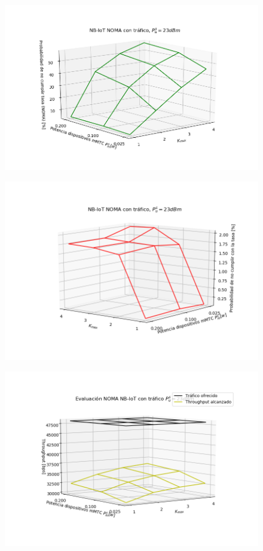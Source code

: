 \begin{figure}[th]
    \centering
    \includegraphics[scale=1]{Figures/ResultadosTrafico/Figure_2.png}
    \decoRule
    \caption[]{}
    \label{fig:}
\end{figure}

\begin{figure}[th]
    \centering
    \includegraphics[scale=1]{Figures/ResultadosTrafico/Figure_3.png}
    \decoRule
    \caption[]{}
    \label{fig:}
\end{figure}

\begin{figure}[th]
    \centering
    \includegraphics[scale=1]{Figures/ResultadosTrafico/Figure_4.png}
    \decoRule
    \caption[]{}
    \label{fig:}
\end{figure}